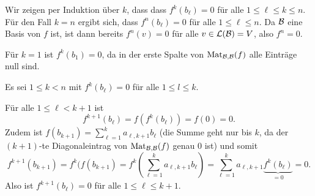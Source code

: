 \documentclass[a4paper,10pt]{scrartcl}
\begin{document}
Wir zeigen per Induktion über $k$, dass dass $f^k(b_\ell) = 0$ für alle $1 \leq \ell \leq k \leq n$. Für den Fall $k = n$ ergibt sich, dass $f^n(b_\ell) = 0$ für alle $1 \leq \ell \leq n$. Da $\mathcal{B}$ eine Basis von $f$ ist, ist dann bereits $f^n(v) = 0$ für alle $v \in \mathcal{L}(\mathcal{B}) = V$, also $f^n = 0$.

\begin{is}
 Für $k = 1$ ist $f^k(b_1) = 0$, da in der erste Spalte von $\mathrm{Mat}_{\mathcal{B},\mathcal{B}}(f)$ alle Einträge null sind.
\end{is}
\begin{iv}
 Es sei $1 \leq k < n$ mit $f^k(b_\ell) = 0$ für alle $1 \leq l \leq k$.
\end{iv}
\begin{is}
 Für alle $1 \leq \ell < k+1$ ist
 \[
  f^{k+1}(b_\ell)
  = f(f^k(b_\ell))
  = f(0)
  = 0.
 \]
 Zudem ist $f(b_{k+1}) = \sum_{\ell=1}^k a_{\ell,k+1} b_\ell$ (die Summe geht nur bis $k$, da der $(k+1)$-te Diagonaleintrag von $\mathrm{Mat}_{\mathcal{B},\mathcal{B}}(f)$ genau $0$ ist) und somit
 \[
  f^{k+1}(b_{k+1})
  = f^k(f(b_{k+1})
  = f^k\left( \sum_{\ell=1}^k a_{\ell,k+1} b_\ell \right)
  = \sum_{\ell=1}^k a_{\ell,k+1} \underbrace{f^k(b_\ell)}_{=0}
  = 0.
 \]
 Also ist $f^{k+1}(b_\ell) = 0$ für alle $1 \leq \ell \leq k+1$.
\end{is}
\end{document}
